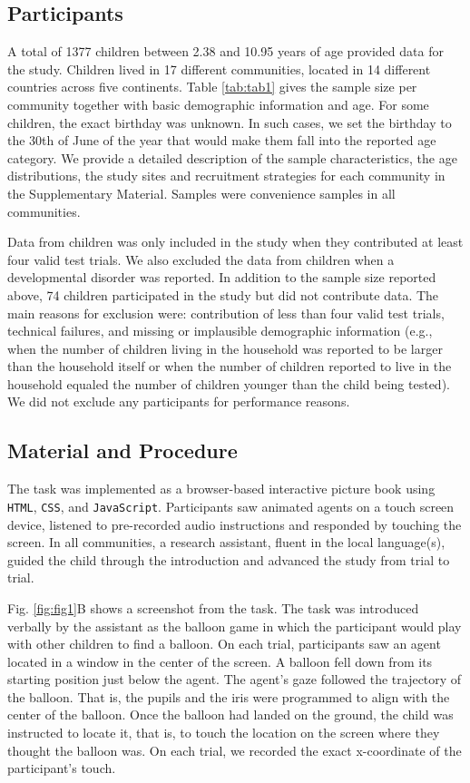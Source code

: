 \documentclass[
  man,floatsintext]{apa7}
\begin{document}
\subsection{Participants}\label{participants}

A total of 1377 children between 2.38 and 10.95 years of age provided data for the study. Children lived in 17 different communities, located in 14 different countries across five continents. Table \ref{tab:tab1} gives the sample size per community together with basic demographic information and age. For some children, the exact birthday was unknown. In such cases, we set the birthday to the 30th of June of the year that would make them fall into the reported age category. We provide a detailed description of the sample characteristics, the age distributions, the study sites and recruitment strategies for each community in the Supplementary Material. Samples were convenience samples in all communities.

Data from children was only included in the study when they contributed at least four valid test trials. We also excluded the data from children when a developmental disorder was reported. In addition to the sample size reported above, 74 children participated in the study but did not contribute data. The main reasons for exclusion were: contribution of less than four valid test trials, technical failures, and missing or implausible demographic information (e.g., when the number of children living in the household was reported to be larger than the household itself or when the number of children reported to live in the household equaled the number of children younger than the child being tested). We did not exclude any participants for performance reasons.

\subsection{Material and Procedure}\label{material-and-procedure}

The task was implemented as a browser-based interactive picture book using \texttt{HTML}, \texttt{CSS}, and \texttt{JavaScript}. Participants saw animated agents on a touch screen device, listened to pre-recorded audio instructions and responded by touching the screen. In all communities, a research assistant, fluent in the local language(s), guided the child through the introduction and advanced the study from trial to trial.

Fig. \ref{fig:fig1}B shows a screenshot from the task. The task was introduced verbally by the assistant as the balloon game in which the participant would play with other children to find a balloon. On each trial, participants saw an agent located in a window in the center of the screen. A balloon fell down from its starting position just below the agent. The agent's gaze followed the trajectory of the balloon. That is, the pupils and the iris were programmed to align with the center of the balloon. Once the balloon had landed on the ground, the child was instructed to locate it, that is, to touch the location on the screen where they thought the balloon was. On each trial, we recorded the exact x-coordinate of the participant's touch.
\end{document}

